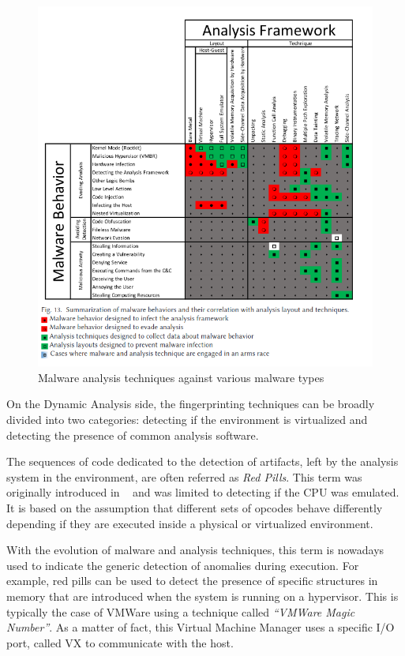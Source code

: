 \noindent
\begin{figure}[htp]
\centering
\includegraphics[width=\linewidth]{images/mal-fram.png}
\caption{Malware analysis techniques against various malware types}
\label{fig:mfrm}
\end{figure}

On the Dynamic Analysis side, the fingerprinting techniques can be broadly divided into two categories: detecting if the environment is virtualized and detecting the presence of common analysis software. 

The sequences of code dedicated to the detection of artifacts, left by the analysis system in the environment, are often referred as \textit{Red Pills}. This term was originally introduced in ~\cite{bruschi} and was limited to detecting if the CPU was emulated. It is based on the assumption that different sets of opcodes behave differently depending if they are executed inside a physical or virtualized environment. 

With the evolution of malware and analysis techniques, this term is nowadays used to indicate the generic detection of anomalies during execution. For example, red pills can be used to detect the presence of specific structures in memory that are introduced when the system is running on a hypervisor. This is typically the case of VMWare using a technique called \textit{“VMWare Magic Number”}. As a matter of fact, this Virtual Machine Manager uses a specific I/O port, called VX to communicate with the host. 

